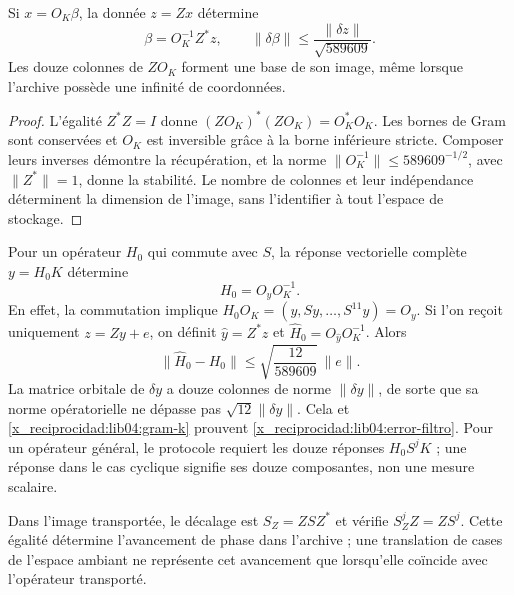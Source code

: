 \begin{theorem}
\label{x_reciprocidad:lib04:teo-marco}
Si \(x=O_K\beta\), la donnée \(z=Zx\) détermine
\begin{equation}
 \beta=O_K^{-1}Z^*z,\qquad
 \|\delta\beta\|\leq\frac{\|\delta z\|}{\sqrt{589609}}.
 \label{x_reciprocidad:lib04:inversa-marco}
\end{equation}
Les douze colonnes de \(ZO_K\) forment une base de son image, même lorsque l'archive possède une infinité de coordonnées.
\end{theorem}

\begin{proof}
L'égalité \(Z^*Z=I\) donne \((ZO_K)^*(ZO_K)=O_K^*O_K\). Les bornes de Gram sont conservées et \(O_K\) est inversible grâce à la borne inférieure stricte. Composer leurs inverses démontre la récupération, et la norme \(\|O_K^{-1}\|\leq589609^{-1/2}\), avec \(\|Z^*\|=1\), donne la stabilité. Le nombre de colonnes et leur indépendance déterminent la dimension de l'image, sans l'identifier à tout l'espace de stockage.
\end{proof}

Pour un opérateur \(H_0\) qui commute avec \(S\), la réponse
vectorielle complète \(y=H_0K\) détermine
\begin{equation}
 H_0=O_yO_K^{-1}.
 \label{x_reciprocidad:lib04:identificacion-filtro}
\end{equation}
En effet, la commutation implique
\(H_0O_K=(y,Sy,\ldots,S^{11}y)=O_y\). Si l’on reçoit uniquement
\(z=Zy+e\), on définit \(\widehat y=Z^*z\) et
\(\widehat H_0=O_{\widehat y}O_K^{-1}\). Alors
\begin{equation}
 \|\widehat H_0-H_0\|
 \leq\sqrt{\frac{12}{589609}}\,\|e\|.
 \label{x_reciprocidad:lib04:error-filtro}
\end{equation}
La matrice orbitale de \(\delta y\) a douze colonnes de norme
\(\|\delta y\|\), de sorte que sa norme opératorielle ne dépasse pas
\(\sqrt{12}\|\delta y\|\). Cela et
\eqref{x_reciprocidad:lib04:gram-k} prouvent \eqref{x_reciprocidad:lib04:error-filtro}.
Pour un opérateur général, le protocole requiert les douze réponses
\(H_0S^jK\) ; une réponse dans le cas cyclique signifie ses douze
composantes, non une mesure scalaire.

Dans l’image transportée, le décalage est
\(S_Z=ZSZ^*\) et vérifie \(S_Z^jZ=ZS^j\). Cette égalité
détermine l’avancement de phase dans l’archive ; une translation de cases
de l’espace ambiant ne représente cet avancement que lorsqu’elle coïncide avec
l’opérateur transporté.

